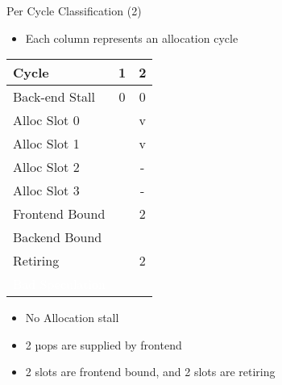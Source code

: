 \documentclass[aspectratio=169,10pt]{beamer}
\begin{document}
\begin{frame}{Per Cycle Classification (2)}
\begin{itemize}
  \item Each column represents an allocation cycle
\end{itemize}

\begin{center}
\begin{tabular}{|l|c|c|}
\hline
\rowcolor{red!20} Cycle & 1 & 2 \\
\hline
\rowcolor{red!20} Back-end Stall & 0 & 0 \\
\hline
\rowcolor{greenbar!50} Alloc Slot 0 & & v \\
\hline
\rowcolor{greenbar!50} Alloc Slot 1 & & v \\
\hline
\rowcolor{greenbar!50} Alloc Slot 2 & & - \\
\hline
\rowcolor{greenbar!50} Alloc Slot 3 & & - \\
\hline
\rowcolor{frontendbound} Frontend Bound & & 2 \\
\hline
\rowcolor{backendbound} Backend Bound & & \\
\hline
\rowcolor{retiring} Retiring & & 2 \\
\hline
\rowcolor{badspec} \textcolor{white}{Bad Speculation} & & \\
\hline
\end{tabular}
\end{center}

\begin{itemize}
  \item No Allocation stall
  \item 2 µops are supplied by frontend
  \item 2 slots are frontend bound, and 2 slots are retiring
\end{itemize}
\end{frame}
\end{document}
